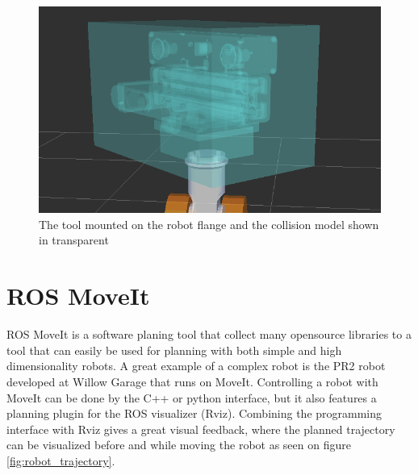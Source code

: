 \begin{figure}[htb]
	\begin{center}
		\includegraphics[scale=0.5,trim=0 0 0 0]{graphics/05_robotics/tool_collision_model.png}%
		\caption{The tool mounted on the robot flange and the collision model shown in transparent}
		\label{fig:tool_collision_model}
	\end{center}
\end{figure}

\section{ROS MoveIt}
\label{sec:moveit}
ROS MoveIt is a software planing tool that collect many opensource libraries to a tool that can easily be used for planning with both simple and high dimensionality robots. A great example of a complex robot is the PR2 robot developed at Willow Garage that runs on MoveIt.
Controlling a robot with MoveIt can be done by the C++ or python interface, but it also features a planning plugin for the ROS visualizer (Rviz). Combining the programming interface with Rviz gives a great visual feedback, where the planned trajectory can be visualized before and while moving the robot as seen on figure \ref{fig:robot_trajectory}.

